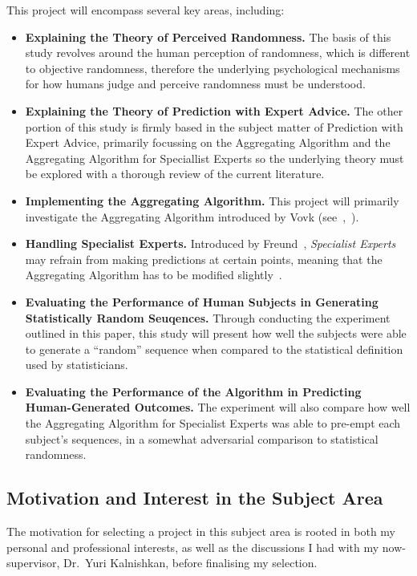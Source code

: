 This project will encompass several key areas, including:
\begin{itemize}
    \item \textbf{Explaining the Theory of Perceived Randomness.} The basis of this study revolves around the human perception of randomness, which is different to objective randomness, therefore the underlying psychological mechanisms for how humans judge and perceive randomness must be understood.
    \item \textbf{Explaining the Theory of Prediction with Expert Advice.} The other portion of this study is firmly based in the subject matter of Prediction with Expert Advice, primarily focussing on the Aggregating Algorithm and the Aggregating Algorithm for Speciallist Experts so the underlying theory must be explored with a thorough review of the current literature.
    \item \textbf{Implementing the Aggregating Algorithm.} This project will primarily investigate the Aggregating Algorithm introduced by Vovk (see~\cite{vovk:1990},\ \cite{vovk:1998}).
    \item \textbf{Handling Specialist Experts.} Introduced by Freund~\cite{freund:1997}, \textit{Specialist Experts} may refrain from making predictions at certain points, meaning that the Aggregating Algorithm has to be modified slightly~\cite{kalnishkan:2015}.
    \item \textbf{Evaluating the Performance of Human Subjects in Generating Statistically Random Seuqences.} Through conducting the experiment outlined in this paper, this study will present how well the subjects were able to generate a ``random'' sequence when compared to the statistical definition used by statisticians.
    \item \textbf{Evaluating the Performance of the Algorithm in Predicting Human-Generated Outcomes.} The experiment will also compare how well the Aggregating Algorithm for Specialist Experts was able to pre-empt each subject's sequences, in a somewhat adversarial comparison to statistical randomness.
\end{itemize}

\subsection{Motivation and Interest in the Subject Area}
The motivation for selecting a project in this subject area is rooted in both my personal and professional interests, as well as the discussions I had with my now-supervisor, Dr.\ Yuri Kalnishkan, before finalising my selection.

